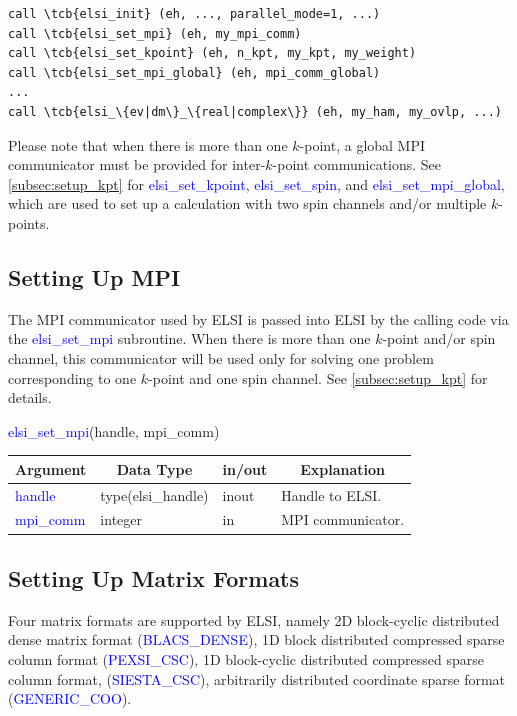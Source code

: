 \documentclass{report}
\newcommand{\tcb}[1]{\textcolor{blue}{#1}}
\begin{document}
\begin{tcolorbox}
\begin{Verbatim}[commandchars=\\\{\}]
call \tcb{elsi_init} (eh, ..., parallel_mode=1, ...)
call \tcb{elsi_set_mpi} (eh, my_mpi_comm)
call \tcb{elsi_set_kpoint} (eh, n_kpt, my_kpt, my_weight)
call \tcb{elsi_set_mpi_global} (eh, mpi_comm_global)
...
call \tcb{elsi_\{ev|dm\}_\{real|complex\}} (eh, my_ham, my_ovlp, ...)
\end{Verbatim}
\end{tcolorbox}

Please note that when there is more than one $k$-point, a global MPI communicator must be provided for inter-$k$-point communications. See \ref{subsec:setup_kpt} for \tcb{elsi\_set\_kpoint}, \tcb{elsi\_set\_spin}, and \tcb{elsi\_set\_mpi\_global}, which are used to set up a calculation with two spin channels and/or multiple $k$-points.

\subsection{Setting Up MPI}
\label{subsec:setup_mpi}
The MPI communicator used by ELSI is passed into ELSI by the calling code via the \tcb{elsi\_set\_mpi} subroutine. When there is more than one $k$-point and/or spin channel, this communicator will be used only for solving one problem corresponding to one $k$-point and one spin channel. See \ref{subsec:setup_kpt} for details.
\begin{labeling}{\hspace{6cm}}
\item [\hspace{0.3cm} \tcb{elsi\_set\_mpi}(handle, mpi\_comm)]
\end{labeling}

\begin{tabular}[]{|p{30mm}|p{30mm}|p{15mm}|p{90mm}|}
\hline
\multicolumn{1}{|c|}{\textbf{Argument}} & \multicolumn{1}{c|}{\textbf{Data Type}} & \multicolumn{1}{c|}{\textbf{in/out}} & \multicolumn{1}{c|}{\textbf{Explanation}}\\
\hline
\tcb{handle}    & type(elsi\_handle) & inout & Handle to ELSI.\\
\hline
\tcb{mpi\_comm} & integer            & in    & MPI communicator.\\
\hline
\end{tabular}

\subsection{Setting Up Matrix Formats}
\label{subsec:setup_matrix}
Four matrix formats are supported by ELSI, namely 2D block-cyclic distributed dense matrix format (\tcb{BLACS\_DENSE}), 1D block distributed compressed sparse column format (\tcb{PEXSI\_CSC}), 1D block-cyclic distributed compressed sparse column format, (\tcb{SIESTA\_CSC}), arbitrarily distributed coordinate sparse format (\tcb{GENERIC\_COO}).
\end{document}
